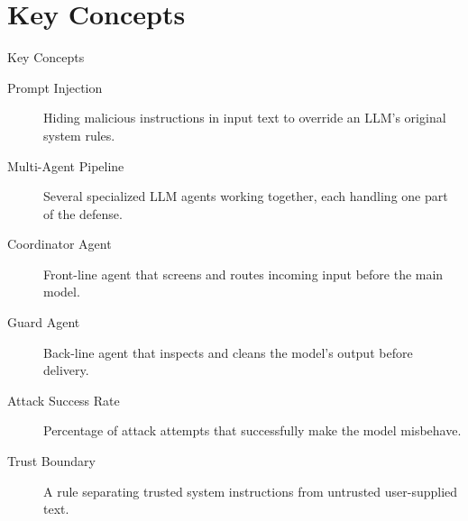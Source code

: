 \documentclass[10pt]{beamer}
\begin{document}
\section{Key Concepts}
\begin{frame}[allowframebreaks]{Key Concepts}
  \begin{description}
    \item[Prompt Injection] Hiding malicious instructions in input text to override an LLM's original system rules.
    \item[Multi-Agent Pipeline] Several specialized LLM agents working together, each handling one part of the defense.
    \item[Coordinator Agent] Front-line agent that screens and routes incoming input before the main model.
    \item[Guard Agent] Back-line agent that inspects and cleans the model's output before delivery.
    \item[Attack Success Rate] Percentage of attack attempts that successfully make the model misbehave.
    \item[Trust Boundary] A rule separating trusted system instructions from untrusted user-supplied text.
  \end{description}
\end{frame}
\end{document}
